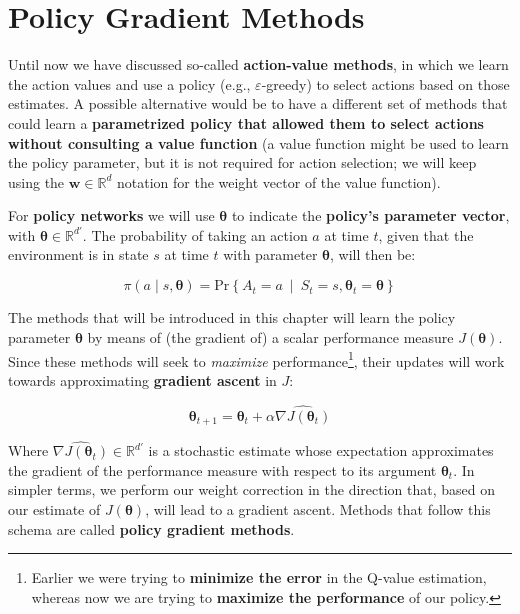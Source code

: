 \chapter{Policy Gradient Methods}
\label{ch:policygradientmethods}
Until now we have discussed so-called \textbf{action-value methods}, in which we learn the action values and use a policy (e.g., $\varepsilon$-greedy) to select actions based on those estimates. A possible alternative would be to have a different set of methods that could learn a \textbf{parametrized policy that allowed them to select actions without consulting a value function} (a value function might be used to learn the policy parameter, but it is not required for action selection; we will keep using the $\boldsymbol{w} \in \mathbb{R}^d$ notation for the weight vector of the value function).

For \textbf{policy networks} we will use $\boldsymbol{\theta}$ to indicate the \textbf{policy’s parameter vector}, with $\boldsymbol{\theta} \in \mathbb{R}^{d'}$. The probability of taking an action $a$ at time $t$, given that the environment is in state $s$ at time $t$ with parameter $\boldsymbol{\theta}$, will then be:

\begin{equation*}
    \pi \left( a \middle\vert s, \boldsymbol{\theta} \right) = \text{Pr}\left\{ A_t = a \ \middle\vert \ S_t = s, \boldsymbol{\theta}_t = \boldsymbol{\theta} \right\}
\end{equation*}

The methods that will be introduced in this chapter will learn the policy parameter $\boldsymbol{\theta}$ by means of (the gradient of) a scalar performance measure $J(\boldsymbol{\theta})$. Since these methods will seek to \textit{maximize} performance\footnote{Earlier we were trying to \textbf{minimize the error} in the Q-value estimation, whereas now we are trying to \textbf{maximize the performance} of our policy.}, their updates will work towards approximating \textbf{gradient ascent} in $J$:

\begin{equation}
    \boldsymbol{\theta}_{t+1} = \boldsymbol{\theta}_t + \alpha \widehat{\nabla J(\boldsymbol{\theta}_t)}
    \label{eq:ch8-gradientascentupdate}
\end{equation}

Where $\widehat{\nabla J(\boldsymbol{\theta}_t)} \in \mathbb{R}^{d'}$ is a stochastic estimate whose expectation approximates the gradient of the performance measure with respect to its argument $\boldsymbol{\theta}_t$. In simpler terms, we perform our weight correction in the direction that, based on our estimate of $J(\boldsymbol{\theta})$, will lead to a gradient ascent. Methods that follow this schema are called \textbf{policy gradient methods}.

